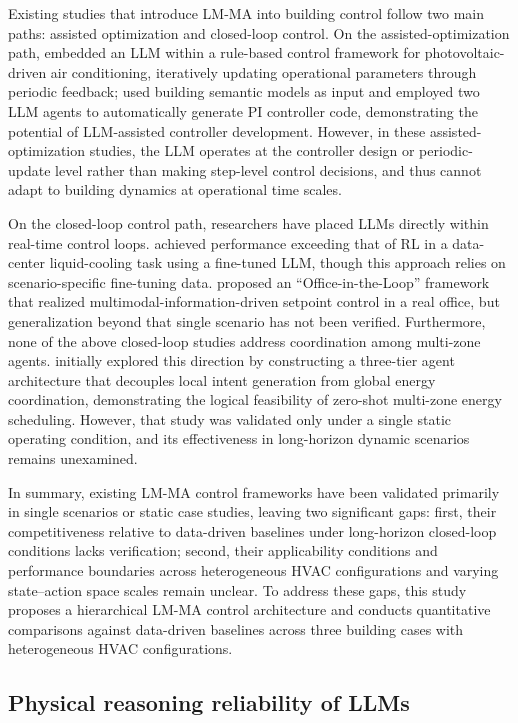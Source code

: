 \documentclass[a4paper]{cas-sc}
\begin{document}
Existing studies that introduce LM-MA into building control follow two main paths: assisted optimization and closed-loop control. On the assisted-optimization path, \citet{Li2025-gd} embedded an LLM within a rule-based control framework for photovoltaic-driven air conditioning, iteratively updating operational parameters through periodic feedback; \citet{Hu2025-jb} used building semantic models as input and employed two LLM agents to automatically generate PI controller code, demonstrating the potential of LLM-assisted controller development. However, in these assisted-optimization studies, the LLM operates at the controller design or periodic-update level rather than making step-level control decisions, and thus cannot adapt to building dynamics at operational time scales.

On the closed-loop control path, researchers have placed LLMs directly within real-time control loops. \citet{Ghorbanpour2025-icml} achieved performance exceeding that of RL in a data-center liquid-cooling task using a fine-tuned LLM, though this approach relies on scenario-specific fine-tuning data. \citet{Sawada2024-id} proposed an ``Office-in-the-Loop'' framework that realized multimodal-information-driven setpoint control in a real office, but generalization beyond that single scenario has not been verified. Furthermore, none of the above closed-loop studies address coordination among multi-zone agents. \citet{Liu2025-ql} initially explored this direction by constructing a three-tier agent architecture that decouples local intent generation from global energy coordination, demonstrating the logical feasibility of zero-shot multi-zone energy scheduling. However, that study was validated only under a single static operating condition, and its effectiveness in long-horizon dynamic scenarios remains unexamined.

In summary, existing LM-MA control frameworks have been validated primarily in single scenarios or static case studies, leaving two significant gaps: first, their competitiveness relative to data-driven baselines under long-horizon closed-loop conditions lacks verification; second, their applicability conditions and performance boundaries across heterogeneous HVAC configurations and varying state--action space scales remain unclear. To address these gaps, this study proposes a hierarchical LM-MA control architecture and conducts quantitative comparisons against data-driven baselines across three building cases with heterogeneous HVAC configurations.

\subsection{Physical reasoning reliability of LLMs}
\end{document}
